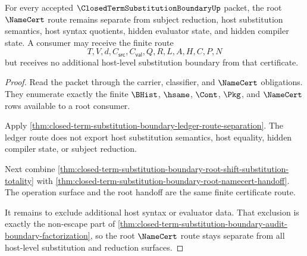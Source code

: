 \begin{theorem}
\label{thm:closed-term-substitution-boundary-root-consumer-namecert-separation}
For every accepted $\ClosedTermSubstitutionBoundaryUp$ packet, the root $\NameCert$ route remains separate from subject reduction, host substitution semantics, host syntax quotients, hidden evaluator state, and hidden compiler state. A consumer may receive the finite route
$$
T,V,d,C_{\mathsf{src}},C_{\mathsf{val}},Q,R,L,A,H,C,P,N
$$
but receives no additional host-level substitution boundary from that certificate.
\end{theorem}
\begin{proof}
Read the packet through the carrier, classifier, and $\NameCert$ obligations. They enumerate exactly the finite $\BHist$, $\hsame$, $\Cont$, $\Pkg$, and $\NameCert$ rows available to a root consumer.

Apply \autoref{thm:closed-term-substitution-boundary-ledger-route-separation}. The ledger route does not export host substitution semantics, host equality, hidden compiler state, or subject reduction.

Next combine \autoref{thm:closed-term-substitution-boundary-root-shift-substitution-totality} with \autoref{thm:closed-term-substitution-boundary-root-namecert-handoff}. The operation surface and the root handoff are the same finite certificate route.

It remains to exclude additional host syntax or evaluator data. That exclusion is exactly the non-escape part of \autoref{thm:closed-term-substitution-boundary-audit-boundary-factorization}, so the root $\NameCert$ route stays separate from all host-level substitution and reduction surfaces.
\end{proof}
